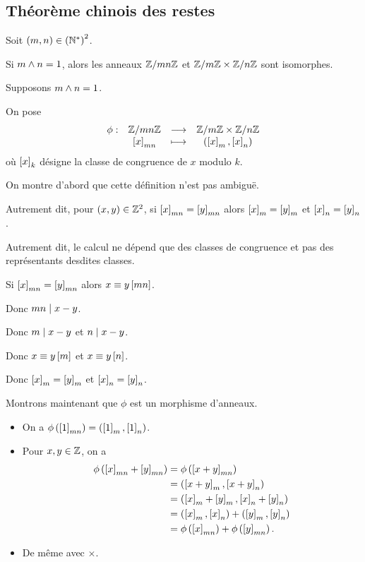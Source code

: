 \subsection{Théorème chinois des restes}

\begin{theo}
Soit \(\left(m,n\right)\in\left(\mathbb{N}^*\right)^2\).

Si \(m\land n=1\), alors les anneaux \(\mathbb{Z}/mn\mathbb{Z}\) et \(\mathbb{Z}/m\mathbb{Z}\times\mathbb{Z}/n\mathbb{Z}\) sont isomorphes.
\end{theo}

\begin{dem}
Supposons \(m\land n=1\).

On pose \[\begin{array}[t]{cccc}\phi : & \mathbb{Z}/mn\mathbb{Z} & \longrightarrow & \mathbb{Z}/m\mathbb{Z}\times\mathbb{Z}/n\mathbb{Z} \\ & \left[x\right]_{mn} & \longmapsto & \left(\left[x\right]_m,\left[x\right]_n\right)\end{array}\] où \(\left[x\right]_k\) désigne la classe de congruence de \(x\) modulo \(k\).

On montre d'abord que cette définition n'est pas ambiguë.

Autrement dit, pour \(\left(x,y\right)\in\mathbb{Z}^2\), si \(\left[x\right]_{mn}=\left[y\right]_{mn}\) alors \(\left[x\right]_m=\left[y\right]_m\) et \(\left[x\right]_n=\left[y\right]_n\).

Autrement dit, le calcul ne dépend que des classes de congruence et pas des représentants desdites classes.

Si \(\left[x\right]_{mn}=\left[y\right]_{mn}\) alors \(x\equiv y\left[mn\right]\).

Donc \(mn\mid x-y\).

Donc \(m\mid x-y\) et \(n\mid x-y\).

Donc \(x\equiv y\left[m\right]\) et \(x\equiv y\left[n\right]\).

Donc \(\left[x\right]_m=\left[y\right]_m\) et \(\left[x\right]_n=\left[y\right]_n\).

Montrons maintenant que \(\phi\) est un morphisme d'anneaux.

\begin{itemize}
    \item On a \(\phi\left(\left[1\right]_{mn}\right)=\left(\left[1\right]_m,\left[1\right]_n\right)\). \\
    \item Pour \(x,y\in\mathbb{Z}\), on a \[\begin{aligned}
        \phi\left(\left[x\right]_{mn}+\left[y\right]_{mn}\right)&=\phi\left(\left[x+y\right]_{mn}\right) \\
        &=\left(\left[x+y\right]_m,\left[x+y\right]_n\right) \\
        &=\left(\left[x\right]_m+\left[y\right]_m,\left[x\right]_n+\left[y\right]_n\right) \\
        &=\left(\left[x\right]_m,\left[x\right]_n\right)+\left(\left[y\right]_m,\left[y\right]_n\right) \\
        &=\phi\left(\left[x\right]_{mn}\right)+\phi\left(\left[y\right]_{mn}\right).
    \end{aligned}\]
    \item De même avec \(\times\).
\end{itemize}


\end{dem}
